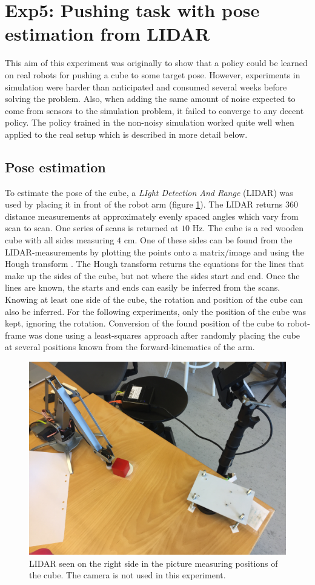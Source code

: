 \section{Exp5: Pushing task with pose estimation from LIDAR}

This aim of this experiment was originally to show that a policy could be
learned on real robots for pushing a cube to some target pose. However,
experiments in simulation were harder than anticipated and consumed several
weeks before solving the problem. Also, when adding the same amount of noise
expected to come from sensors to the simulation problem, it failed to converge
to any decent policy. The policy trained in the non-noisy simulation worked
quite well when applied to the real setup which is described in more detail
below.

\subsection{Pose estimation}

To estimate the pose of the cube, a \textit{LIght Detection And Range} (LIDAR)
was used by placing it in front of the robot arm (figure \ref{fig:eef-frame}).
The LIDAR returns $360$ distance measurements at approximately evenly spaced
angles which vary from scan to scan. One series of scans is returned at $10$
Hz. The cube is a red wooden cube with all sides measuring $4$ cm. One of these
sides can be found from the LIDAR-measurements by plotting the points onto a
matrix/image and using the Hough transform \cite{duda1972use}. The Hough
transform returns the equations for the lines that make up the sides of the
cube, but not where the sides start and end. Once the lines are known, the
starts and ends can easily be inferred from the scans.  Knowing at least one
side of the cube, the rotation and position of the cube can also be inferred.
For the following experiments, only the position of the cube was kept, ignoring
the rotation. Conversion of the found position of the cube to robot-frame was
done using a least-squares approach after randomly placing the cube at several
positions known from the forward-kinematics of the arm.

\begin{figure}[h!]
    \centering
    \includegraphics[width=0.48 \textwidth]{res/camera_placement_fixed.jpg}

    \caption{LIDAR seen on the right side in the picture measuring positions of
    the cube. The camera is not used in this experiment.}

    \label{fig:eef-frame}
    
\end{figure}

